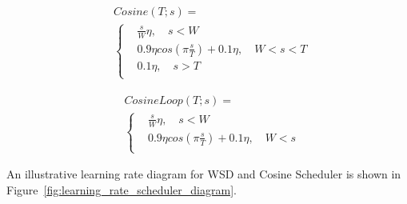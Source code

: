 \begin{figure}[htbp]
    \centering
    \begin{minipage}{0.47\linewidth}
        \begin{equation*}
    \begin{aligned}
    & Cosine(T; s) = \\
    & \begin{cases}
       & \frac{s}{W} \eta, \quad s<W \\
       & 0.9\eta cos(\pi \frac{s}{T}) + 0.1\eta, \quad W < s < T \\
       & 0.1\eta,\quad  s > T \\
    \end{cases}
\end{aligned}
        \end{equation*}
    \end{minipage}
    \hfill %
    \begin{minipage}{0.52\linewidth}
             \begin{equation*}
    \begin{aligned}
    & CosineLoop(T; s) = \\
    & \begin{cases}
       & \frac{s}{W} \eta, \quad s<W \\
       & 0.9\eta cos(\pi \frac{s}{T}) + 0.1\eta, \quad W < s  \\
    \end{cases}
\end{aligned}
        \end{equation*}
    \end{minipage}
\end{figure}


An illustrative learning rate diagram for WSD and Cosine Scheduler is shown in Figure~\ref{fig:learning_rate_scheduler_diagram}.


